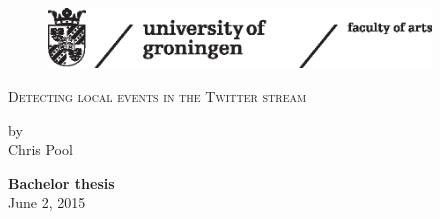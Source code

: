 
\begin{titlepage}

\begin{figure}[h!] %

 \includegraphics[width=4in]{Figures/ruglogo.eps} 
\end{figure}
\begin{center}

\vspace{30 mm}
\begingroup \linespread{1,75} \selectfont 
\textsc{\LARGE Detecting local events in the Twitter stream}\\[1,5cm]
\endgroup


by\\[0,5cm]
Chris Pool\\[2,5cm]


\end{center}
\vfill
\textbf{Bachelor thesis}\\
June 2, 2015



\end{titlepage}